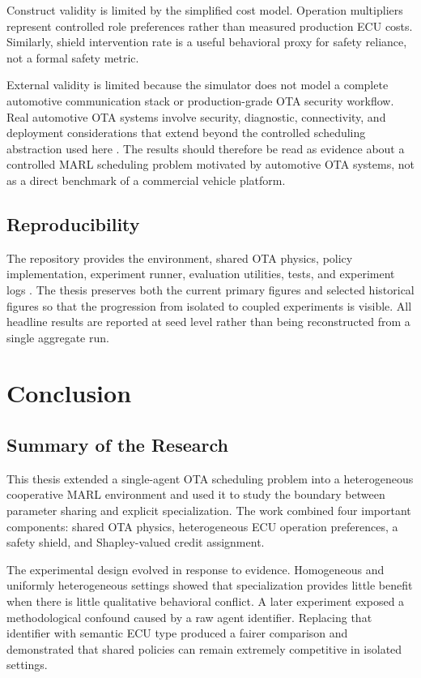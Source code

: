 \documentclass{iutbscthesis}
\begin{document}
Construct validity is limited by the simplified cost model. Operation multipliers represent controlled role preferences rather than measured production ECU costs. Similarly, shield intervention rate is a useful behavioral proxy for safety reliance, not a formal safety metric.

External validity is limited because the simulator does not model a complete automotive communication stack or production-grade OTA security workflow. Real automotive OTA systems involve security, diagnostic, connectivity, and deployment considerations that extend beyond the controlled scheduling abstraction used here \parencite{halder2020survey,ghosal2022stride,shoker2023scalota}. The results should therefore be read as evidence about a controlled MARL scheduling problem motivated by automotive OTA systems, not as a direct benchmark of a commercial vehicle platform.

\section{Reproducibility}
The repository provides the environment, shared OTA physics, policy implementation, experiment runner, evaluation utilities, tests, and experiment logs \parencite{ma_reles_ota_repo}. The thesis preserves both the current primary figures and selected historical figures so that the progression from isolated to coupled experiments is visible. All headline results are reported at seed level rather than being reconstructed from a single aggregate run.

\chapter{Conclusion}

\section{Summary of the Research}
This thesis extended a single-agent OTA scheduling problem into a heterogeneous cooperative MARL environment and used it to study the boundary between parameter sharing and explicit specialization. The work combined four important components: shared OTA physics, heterogeneous ECU operation preferences, a safety shield, and Shapley-valued credit assignment.

The experimental design evolved in response to evidence. Homogeneous and uniformly heterogeneous settings showed that specialization provides little benefit when there is little qualitative behavioral conflict. A later experiment exposed a methodological confound caused by a raw agent identifier. Replacing that identifier with semantic ECU type produced a fairer comparison and demonstrated that shared policies can remain extremely competitive in isolated settings.
\end{document}
